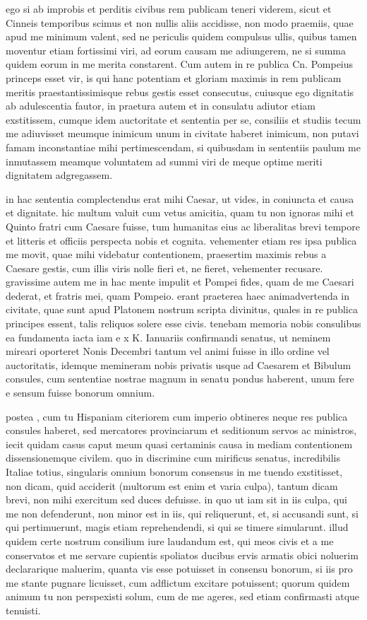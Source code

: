  ego si ab improbis et perditis civibus rem publicam teneri viderem, sicut et Cinneis temporibus scimus et non nullis aliis accidisse, non modo praemiis, quae apud me minimum valent, sed ne periculis quidem compulsus ullis, quibus tamen moventur etiam fortissimi viri, ad eorum causam me adiungerem, ne si summa quidem eorum in me merita constarent. Cum autem in re publica Cn. Pompeius princeps esset vir, is qui hanc potentiam et gloriam maximis in rem publicam meritis praestantissimisque rebus gestis esset consecutus, cuiusque ego dignitatis ab adulescentia fautor, in praetura autem et in consulatu adiutor etiam exstitissem, cumque idem auctoritate et sententia per se, consiliis et studiis tecum me adiuvisset meumque inimicum unum in civitate haberet inimicum, non putavi famam inconstantiae mihi pertimescendam, si quibusdam in sententiis paulum me inmutassem meamque voluntatem ad summi viri de meque optime meriti dignitatem adgregassem.

 in hac sententia complectendus erat mihi Caesar, ut vides, in coniuncta et causa et dignitate. hic multum valuit cum vetus amicitia, quam tu non ignoras mihi et Quinto fratri cum Caesare fuisse, tum humanitas eius ac liberalitas brevi tempore et litteris et officiis perspecta nobis et cognita. vehementer etiam res ipsa publica me movit, quae mihi videbatur contentionem, praesertim maximis rebus a Caesare gestis, cum illis viris nolle fieri et, ne fieret, vehementer recusare. gravissime autem me in hac mente impulit et Pompei fides, quam de me Caesari dederat, et fratris mei, quam Pompeio. erant praeterea haec animadvertenda in civitate, quae sunt apud Platonem nostrum scripta divinitus, quales in re publica principes essent, talis reliquos solere esse civis. tenebam memoria nobis consulibus ea fundamenta iacta iam e x K. Ianuariis confirmandi senatus, ut neminem mireari oporteret Nonis Decembri tantum vel animi fuisse in illo ordine vel auctoritatis, idemque memineram nobis privatis usque ad Caesarem et Bibulum consules, cum sententiae nostrae magnum in senatu pondus haberent, unum fere e sensum fuisse bonorum omnium.

 postea , cum tu Hispaniam citeriorem cum imperio obtineres neque res publica consules haberet, sed mercatores provinciarum et seditionum servos ac ministros, iecit quidam casus caput meum quasi certaminis causa in mediam contentionem dissensionemque civilem. quo in discrimine cum mirificus senatus, incredibilis Italiae totius, singularis omnium bonorum consensus in me tuendo exstitisset, non dicam, quid acciderit (multorum est enim et varia culpa), tantum dicam brevi, non mihi exercitum sed duces defuisse. in quo ut iam sit in iis culpa, qui me non defenderunt, non minor est in iis, qui reliquerunt, et, si accusandi sunt, si qui pertimuerunt, magis etiam reprehendendi, si qui se timere simularunt. illud quidem certe nostrum consilium iure laudandum est, qui meos civis et a me conservatos et me servare cupientis spoliatos ducibus ervis armatis obici noluerim declararique maluerim, quanta vis esse potuisset in consensu bonorum, si iis pro me stante pugnare licuisset, cum adflictum excitare potuissent; quorum quidem animum tu non perspexisti solum, cum de me ageres, sed etiam confirmasti atque tenuisti.

